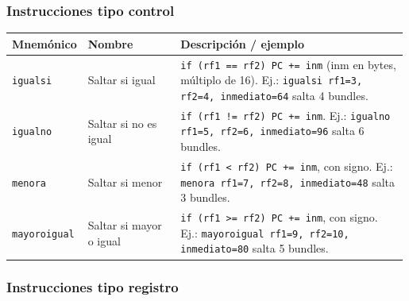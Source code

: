 \subsubsection{Instrucciones tipo
control}\label{instrucciones-tipo-control}

\begin{longtable}[]{@{}p{0.15\linewidth}p{0.240\linewidth}p{0.6\linewidth}@{}}
\toprule\noalign{}
Mnemónico & Nombre & Descripción / ejemplo \\
\midrule\noalign{}
\endhead
\bottomrule\noalign{}
\endlastfoot
\texttt{igualsi} & Saltar si igual &
\texttt{if (rf1 == rf2) PC += inm} (inm en bytes,
múltiplo de 16). Ej.:
\texttt{igualsi rf1=3, rf2=4, inmediato=64} salta 4
bundles. \\
\texttt{igualno} & Saltar si no es igual &
{\lstinline"if (rf1 != rf2) PC += inm"}. Ej.:
\texttt{igualno rf1=5, rf2=6, inmediato=96} salta 6
bundles. \\
\texttt{menora} & Saltar si menor &
\texttt{if (rf1 \textless{} rf2) PC += inm}, con signo. Ej.:
\texttt{menora rf1=7, rf2=8, inmediato=48} salta 3
bundles. \\
\texttt{mayoroigual} & Saltar si mayor o igual &
\texttt{if (rf1 \textgreater{}= rf2) PC += inm}, con signo. Ej.:
\texttt{mayoroigual rf1=9, rf2=10, inmediato=80} salta
5 bundles. \\
\end{longtable}

\subsubsection{Instrucciones tipo
registro}\label{instrucciones-tipo-registro}


